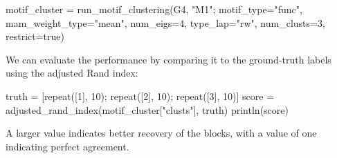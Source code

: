 \documentclass{article}
\begin{document}
\begin{tcolorbox}[colback=black!5!white,colframe=black!15!white]
\begin{juliablock}
motif_cluster = run_motif_clustering(G4, "M1";
                                     motif_type="func",
                                     mam_weight_type="mean",
                                     num_eigs=4,
                                     type_lap="rw",
                                     num_clusts=3,
                                     restrict=true)
\end{juliablock}
\end{tcolorbox}

We can evaluate the performance by comparing it to the ground-truth
labels using the adjusted Rand index:

\begin{tcolorbox}[colback=black!5!white,colframe=black!15!white]
\begin{juliablock}
truth = [repeat([1], 10); repeat([2], 10); repeat([3], 10)]
score = adjusted_rand_index(motif_cluster["clusts"], truth)
println(score)
\end{juliablock}
\texttt{\obeylines\printpythontex}
\end{tcolorbox}

A larger value indicates better recovery of the blocks,
with a value of one indicating perfect agreement.



\end{document}
